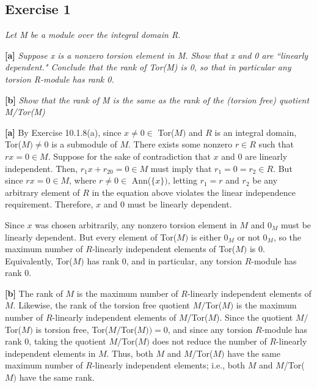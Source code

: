 \subsection*{Exercise 1}
\begin{framed}
\textit{Let M be a module over the integral domain R.}

\textbf{[a]} \textit{Suppose x is a nonzero torsion element in M. Show that x and 0 are ``linearly dependent." Conclude that the rank of Tor(M) is 0, so that in particular any torsion R-module has rank 0.}

\textbf{[b]} \textit{Show that the rank of M is the same as the rank of the (torsion free) quotient M/Tor(M)}
\end{framed}

\textbf{[a]} By Exercise 10.1.8(a), since $x \not= 0 \in$ Tor($M)$ and $R$ is an integral domain, Tor($M) \not= 0$ is a submodule of $M$. There exists some nonzero $r \in R$ such that $rx = 0 \in M$. Suppose for the sake of contradiction that $x$ and 0 are linearly independent. Then, $r_1x + r_20 = 0 \in M$ must imply that $r_1 = 0 = r_2 \in R$. But since $rx = 0 \in M$, where $r \not= 0 \in$ Ann($\{x\})$, letting $r_1 = r$ and $r_2$ be any arbitrary element of $R$ in the equation above violates the linear independence requirement. Therefore, $x$ and 0 must be linearly dependent.

Since $x$ was chosen arbitrarily, any nonzero torsion element in $M$ and $0_M$ must be linearly dependent. But every element of Tor($M)$ is either $0_M$ or not $0_M$, so the maximum number of $R$-linearly independent elements of Tor($M)$ is 0. Equivalently, Tor($M)$ has rank 0, and in particular, any torsion $R$-module has rank 0.

\textbf{[b]} The rank of $M$ is the maximum number of $R$-linearly independent elements of $M$. Likewise, the rank of the torsion free quotient $M/$Tor($M)$ is the maximum number of $R$-linearly independent elements of $M$/Tor($M$). Since the quotient $M/$Tor($M)$ is torsion free, Tor($M/$Tor($M)) = 0$, and since any torsion $R$-module has rank 0, taking the quotient $M/$Tor($M)$ does not reduce the number of $R$-linearly independent elements in $M$. Thus, both $M$ and $M$/Tor($M)$ have the same maximum number of $R$-linearly independent elements; i.e., both $M$ and $M$/Tor($M)$ have the same rank.